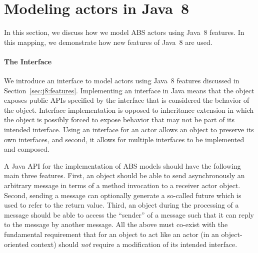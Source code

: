 \section{Modeling actors in Java~8}
\label{sec:j8:actors:realization}

In this section, we discuss how we model ABS actors  using Java~8 features.
In this mapping, we demonstrate how new features of Java~8 are used.

\paragraph{The  Interface}
We introduce an interface to model actors  using Java~8 features discussed in Section~\ref{sec:j8:features}.
Implementing an interface in Java means that the object exposes public APIs specified by the interface that is considered the behavior of the object.
Interface implementation is opposed to inheritance extension in which the object is 
possibly forced to expose behavior that may not be part of its intended interface.  
Using an interface for an actor  allows an object to preserve its own interfaces, and second, 
it allows for multiple interfaces to be implemented and composed.

A Java API for the implementation of ABS models should have the following main three  features.
First, an object should be able to send asynchronously an arbitrary message in terms of a method invocation to a receiver actor object.
Second, sending a message can optionally generate a so-called future which is used to refer to the return value.
Third, an object during the processing of a message should be able to access the ``sender'' of a message such that it can reply to the message by another message.
All the above must co-exist with the 
fundamental requirement that for an object to act like an actor (in an object-oriented context)
should \emph{not} require a modification of its intended interface.

